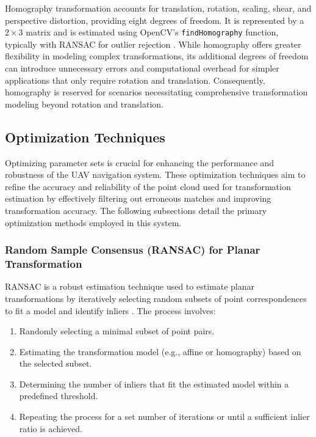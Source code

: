 Homography transformation accounts for translation, rotation, scaling, shear, and perspective distortion, providing eight degrees of freedom. It is represented by a \(2 \times 3\) matrix and is estimated using OpenCV's \texttt{findHomography} function, typically with RANSAC for outlier rejection \cite{opencv_homography}. While homography offers greater flexibility in modeling complex transformations, its additional degrees of freedom can introduce unnecessary errors and computational overhead for simpler applications that only require rotation and translation. Consequently, homography is reserved for scenarios necessitating comprehensive transformation modeling beyond rotation and translation.



\subsection*{Optimization Techniques}

Optimizing parameter sets is crucial for enhancing the performance and robustness of the UAV navigation system. These optimization techniques aim to refine the accuracy and reliability of the point cloud used for transformation estimation by effectively filtering out erroneous matches and improving transformation accuracy. The following subsections detail the primary optimization methods employed in this system.

\subsubsection*{Random Sample Consensus (RANSAC) for Planar Transformation}

RANSAC is a robust estimation technique used to estimate planar transformations by iteratively selecting random subsets of point correspondences to fit a model and identify inliers \cite{ransac1981random}. The process involves:

\begin{enumerate} 
    \item Randomly selecting a minimal subset of point pairs. 
    \item Estimating the transformation model (e.g., affine or homography) based on the selected subset. 
    \item Determining the number of inliers that fit the estimated model within a predefined threshold. 
    \item Repeating the process for a set number of iterations or until a sufficient inlier ratio is achieved. 
\end{enumerate}

